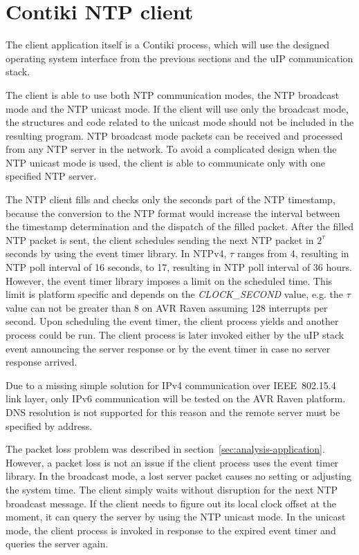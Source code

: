 
\section{Contiki NTP client}\label{sec:design-client}
The client application itself is a Contiki process,
which will use the designed operating system interface from the previous sections
and the uIP communication stack.

The client is able to use both NTP communication modes,
the NTP broadcast mode and the NTP unicast mode.
If the client will use only the broadcast mode, the structures and code
related to the unicast mode should not be included in the resulting program.
NTP broadcast mode packets can be received and processed from any NTP server in the network.
To avoid a complicated design when the NTP unicast mode is used,
the client is able to communicate only with one specified NTP server.

The NTP client fills and checks only the seconds part of the NTP timestamp,
because the conversion to the NTP format would increase the interval
between the timestamp determination and the dispatch of the filled packet.
After the filled NTP packet is sent, the client schedules
sending the next NTP packet in $2^{\tau}$ seconds %
by using the event timer library.
In NTPv4, $\tau$ ranges from 4, resulting in NTP poll interval of 16 seconds,
to 17, resulting in NTP poll interval of 36 hours.
However, the event timer library imposes a limit on the scheduled time.
This limit is platform specific and depends on the {\it{CLOCK\_SECOND}} value,
e.g. the $\tau$ value can not be greater than 8 on AVR Raven assuming 128 interrupts per second.
Upon scheduling the event timer, the client process yields
and another process could be run.
The client process is later invoked either by the uIP stack event
announcing the server response
or by the event timer in case no server response arrived.

Due to a missing simple solution for IPv4 communication over IEEE~802.15.4 link layer,
only IPv6 communication will be tested on the AVR Raven platform.
DNS resolution is not supported for this reason
and the remote server must be specified by address.

The packet loss problem was described in section~\ref{sec:analysis-application}.
However, a packet loss is not an issue if the client process uses the event timer library.
In the broadcast mode, a lost server packet causes no setting or adjusting the system time.
The client simply waits without disruption for the next NTP broadcast message.
If the client needs to figure out its local clock offset at the moment,
it can query the server by using the NTP unicast mode.
In the unicast mode, the client process is invoked in response to the expired event timer
and queries the server again.

